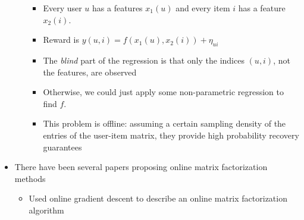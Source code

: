 \documentclass[11pt]{article}
\begin{document}
\begin{itemize}
\begin{itemize}
\begin{itemize}
    \item Every user $u$ has a features $x_1(u)$ and every item $i$ has a feature $x_2(i)$.
    \item Reward is $y(u,i) = f(x_1(u), x_2(i))+ \eta_{ui}$
    \item The \emph{blind} part of the regression is that only the indices $(u,i)$, not the features, are observed
    \item Otherwise, we could just apply some non-parametric regression to find $f$. 
    \item This problem is offline: assuming a certain sampling density of the entries of the user-item matrix, they provide high probability recovery guarantees
    \end{itemize}
  \end{itemize}  
\item There have been several papers proposing online matrix factorization methods
  \begin{itemize}
  \item \cite{abernethy2007online} Used online gradient descent to describe an online matrix factorization algorithm 
  \end{itemize}
\end{itemize}
\end{document}
